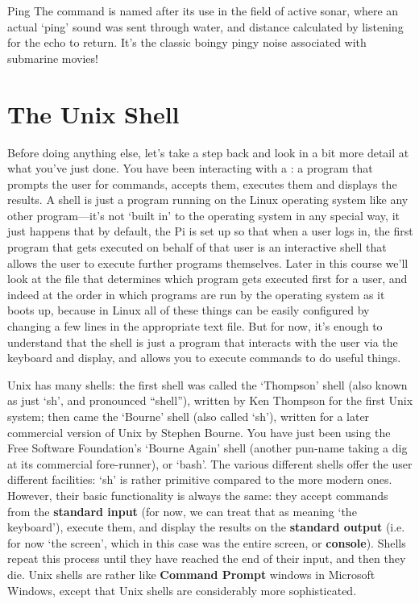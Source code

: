 \begin{diversion}{Ping}
  The  command is named after its use in the field of active sonar, where an actual `ping' sound was sent through water, and distance calculated by listening for the echo to return. It's the classic boingy pingy noise associated with submarine movies! 
\end{diversion}

\section{The Unix Shell}

Before doing anything else, let's take a step back and look in a bit more detail at what you've just done. You have been
interacting with a : a program that prompts
the user for commands, accepts them, executes them and displays the
results. A shell is just a program running on the Linux operating system like any other program---it's not `built in' to the operating system in any special way, it just happens that by default, the Pi is set up so that when a user logs in, the first program that gets executed on behalf of that user is an interactive shell that allows the user to execute further programs themselves. Later in this course we'll look at the file that determines which program gets executed first for a user, and indeed at the order in which programs are run by the operating system as it boots up, because in Linux all of these things can be easily configured by changing a few lines in the appropriate text file. But for now, it's enough to understand that the shell is just a program that interacts with the user via the keyboard and display, and allows you to execute commands to do useful things.

\begin{diversion}
Unix has many shells: the first shell was called the `Thompson' shell (also known as just `sh', and pronounced ``shell''), written by Ken Thompson for the first Unix system; then came the `Bourne' shell (also called `sh'), written for a later commercial version of Unix by Stephen Bourne. You have just been using the Free Software Foundation's `Bourne Again' shell (another pun-name taking a dig at its commercial fore-runner), or `bash'. The various different shells offer the user different facilities: `sh' is rather
primitive compared to the more modern ones. However, their basic
functionality is always the same: they accept commands from the
\textbf{standard input} (for now, we can treat that as meaning `the keyboard'), execute them, and display
the results on the \textbf{standard output} (i.e. for now `the screen', which in
this case was the entire screen, or \textbf{console}). Shells repeat
this process until they have reached the end of their input, and then
they die. Unix shells are rather like \textbf{Command Prompt} windows in Microsoft
Windows, except that Unix shells are considerably more sophisticated.
\end{diversion}

